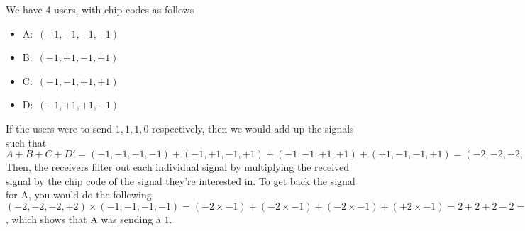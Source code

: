 \begin{example*}{}{}
  We have 4 users, with chip codes as follows
  \begin{itemize}
    \item A:\ $(-1, -1, -1, -1)$
    \item B:\ $(-1, +1, -1, +1)$
    \item C:\ $(-1, -1, +1, +1)$
    \item D:\ $(-1, +1, +1, -1)$
  \end{itemize}

  If the users were to send $1, 1, 1, 0$ respectively, then we would add up the signals such that
   $A+B+C+D' = (-1, -1, -1, -1) + (-1, +1, -1, +1) + (-1, -1, +1, +1) + (+1, -1, -1, +1) = (-2, -2, -2, +2)$\\
  
  Then, the receivers filter out each individual signal by multiplying the received signal by the chip code of the signal
   they're interested in. To get back the signal for A, you would do the following
   $(-2, -2, -2, +2) \times (-1, -1, -1, -1) = (-2 \times -1) + (-2 \times -1) + (-2 \times -1) + (+2 \times -1) = 2+2+2-2 = 4$,
   which shows that A was sending a $1$.
\end{example*}